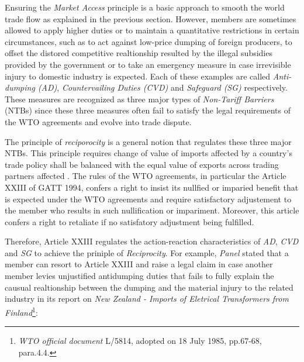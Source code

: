 

Ensuring the \textit{Market Access} principle 
is a basic approach to smooth the world trade flow as explained in the previous section. %
However, members are sometimes allowed to apply higher duties or to maintain a quantitative restrictions in certain circumstances, such as 
to act against low-price dumping of foreign producers, to offset the distored competitive realtionship resulted by the illegal subsidies provided by the government
or to take an emergency measure in case irrevisible injury to domestic industry is expected. Each of these examples 
are called \textit{Anti-dumping (AD)}, \textit{Countervailing Duties (CVD)} and \textit{Safeguard (SG)} respectively. These measures are recognized as 
three major types of \textit{Non-Tariff Barriers} (NTBs) %
since these three measures often fail to satisfy the legal requirements of the WTO agreements and evolve into trade dispute.

The principle of \textit{reciporocity} is a general notion that regulates these three major NTBs.
This principle requires change of value of imports affected by a country's trade policy 
shall be balanced with the equal value of exports across trading partners affected \citep{bagwell1999}.
The rules of the WTO agreements, in particular the Article XXIII of GATT 1994, 
confers a right to insist its nullfied or imparied benefit that is expected under the WTO agreements and require satisfactory adjustement to the member 
who results in such nullification or impariment. Moreover, this article confers a right to retaliate if no satisfatory adjustment being fulfilled.

Therefore, Article XXIII regulates the action-reaction characteristics of \textit{AD}, \textit{CVD} and \textit{SG} to achieve the priniple of \textit{Reciprocity}. %
For example, \textit{Panel} stated that a member can resort to Article XXIII and raise a legal claim in case another member levies unjustified antidumping duties that fails to fully explain the causual realtionship between the dumping and the material injury to the related industry in its report on \textit{New Zealand - Imports of Eletrical Transformers from Finland}\footnote{\textit{WTO official document} L/5814, adopted on 18 July 1985, pp.67-68, para.4.4.}:

